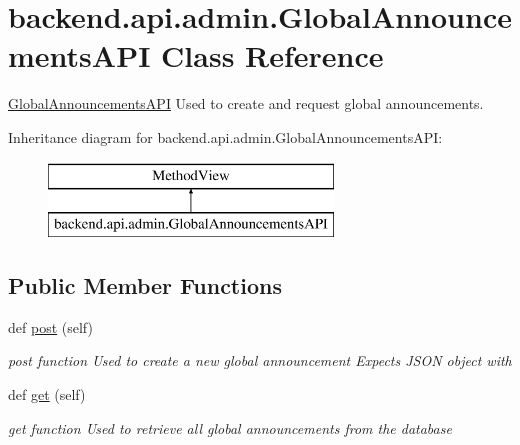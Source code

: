 \hypertarget{classbackend_1_1api_1_1admin_1_1_global_announcements_a_p_i}{}\section{backend.\+api.\+admin.\+Global\+Announcements\+A\+P\+I Class Reference}
\label{classbackend_1_1api_1_1admin_1_1_global_announcements_a_p_i}


\hyperlink{classbackend_1_1api_1_1admin_1_1_global_announcements_a_p_i}{Global\+Announcements\+A\+P\+I} Used to create and request global announcements.  


Inheritance diagram for backend.\+api.\+admin.\+Global\+Announcements\+A\+P\+I\+:\begin{figure}[H]
\begin{center}
\leavevmode
\includegraphics[height=2.000000cm]{classbackend_1_1api_1_1admin_1_1_global_announcements_a_p_i}
\end{center}
\end{figure}
\subsection*{Public Member Functions}
\begin{DoxyCompactItemize}
\item 
def \hyperlink{classbackend_1_1api_1_1admin_1_1_global_announcements_a_p_i_a054cb87d88033e28a5239236077766a5}{post} (self)
\begin{DoxyCompactList}\small\item\em post function Used to create a new global announcement Expects J\+S\+O\+N object with \end{DoxyCompactList}\item 
\hypertarget{classbackend_1_1api_1_1admin_1_1_global_announcements_a_p_i_acaaa2384eac115d2798be3f73b2b34b2}{}def \hyperlink{classbackend_1_1api_1_1admin_1_1_global_announcements_a_p_i_acaaa2384eac115d2798be3f73b2b34b2}{get} (self)\label{classbackend_1_1api_1_1admin_1_1_global_announcements_a_p_i_acaaa2384eac115d2798be3f73b2b34b2}

\begin{DoxyCompactList}\small\item\em get function Used to retrieve all global announcements from the database \end{DoxyCompactList}\end{DoxyCompactItemize}


